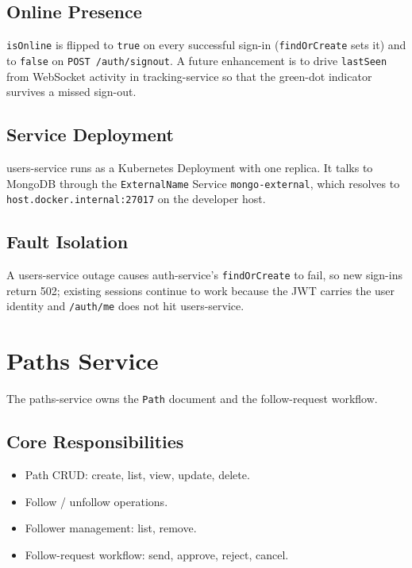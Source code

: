 \documentclass[11pt,a4paper]{article}
\begin{document}
\subsection{Online Presence}
\texttt{isOnline} is flipped to \texttt{true} on every successful
sign-in (\texttt{findOrCreate} sets it) and to \texttt{false} on
\texttt{POST /auth/signout}.  A future enhancement is to drive
\texttt{lastSeen} from WebSocket activity in tracking-service so that
the green-dot indicator survives a missed sign-out.

\subsection{Service Deployment}
users-service runs as a Kubernetes Deployment with one replica.  It
talks to MongoDB through the \texttt{ExternalName} Service
\texttt{mongo-external}, which resolves to
\texttt{host.docker.internal:27017} on the developer host.

\subsection{Fault Isolation}
A users-service outage causes auth-service's
\texttt{findOrCreate} to fail, so new sign-ins return 502; existing
sessions continue to work because the JWT carries the user identity
and \texttt{/auth/me} does not hit users-service.

\section{Paths Service}

The paths-service owns the \texttt{Path} document and the
follow-request workflow.

\subsection{Core Responsibilities}
\begin{itemize}[leftmargin=*]
  \item Path CRUD: create, list, view, update, delete.
  \item Follow / unfollow operations.
  \item Follower management: list, remove.
  \item Follow-request workflow: send, approve, reject, cancel.
\end{itemize}
\end{document}
